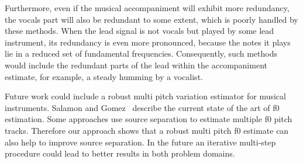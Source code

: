 Furthermore, even if the musical accompaniment will exhibit more redundancy, the vocals part will also be redundant to some extent, which is poorly handled by these methods. When the lead signal is not vocals but played by some lead instrument, its redundancy is even more pronounced, because the notes it plays lie in a reduced set of fundamental frequencies. Consequently, such methods would include the redundant parts of the lead within the accompaniment estimate, for example, a steady humming by a vocalist.

Future work could include a robust multi pitch variation estimator for musical instruments. Salamon and Gomez~\cite{salamon12} describe the current state of the art of f0 estimation. Some approaches use source separation to estimate multiple f0 pitch tracks. Therefore our approach shows that a robust multi pitch f0 estimate can also help to improve source separation. In the future an iterative multi-step procedure could lead to better results in both problem domains.\par
